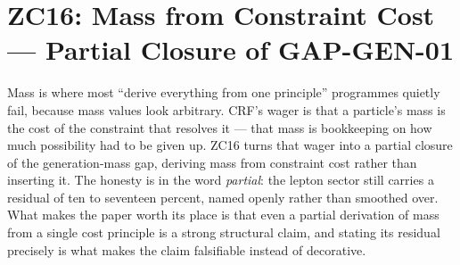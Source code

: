 \documentclass[12pt, a4paper]{article}
\begin{document}

\section{ZC16: Mass from Constraint Cost --- Partial Closure of GAP-GEN-01}
\label{sec:zc16-mass-constraint}

Mass is where most ``derive everything from one principle'' programmes quietly
fail, because mass values look arbitrary. CRF's wager is that a particle's mass
is the cost of the constraint that resolves it --- that mass is bookkeeping on
how much possibility had to be given up. ZC16 turns that wager into a partial
closure of the generation-mass gap, deriving mass from constraint cost rather
than inserting it. The honesty is in the word \emph{partial}: the lepton sector
still carries a residual of ten to seventeen percent, named openly
rather than smoothed over. What makes the paper worth its place is that even a
partial derivation of mass from a single cost principle is a strong structural
claim, and stating its residual precisely is what makes the claim falsifiable
instead of decorative.

\end{document}
